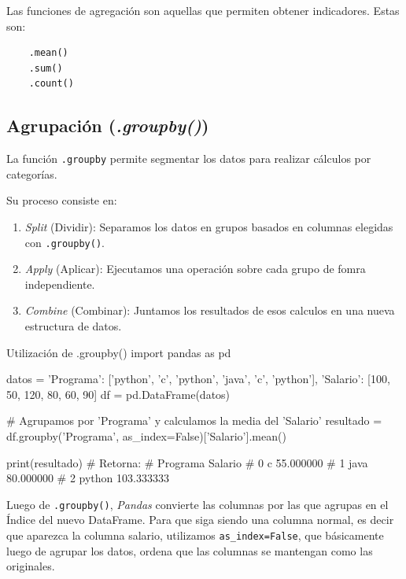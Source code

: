 Las funciones de agregación son aquellas que permiten obtener indicadores. Estas son:
\begin{verbatim}
    .mean() 
    .sum()
    .count()
\end{verbatim}



\subsection{Agrupación (\textit{.groupby()})}

La función \texttt{.groupby} permite segmentar los datos para realizar cálculos por categorías.

Su proceso consiste en:
\begin{enumerate}
    \item \textit{Split} (Dividir): Separamos los datos en grupos basados en columnas elegidas con \texttt{.groupby()}.
    \item \textit{Apply} (Aplicar): Ejecutamos una operación sobre cada grupo de fomra independiente.
    \item \textit{Combine} (Combinar): Juntamos los resultados de esos calculos en una nueva estructura de datos.
\end{enumerate}

\begin{pycode}{Utilización de .groupby()}
import pandas as pd

datos = {
    'Programa': ['python', 'c', 'python', 'java', 'c', 'python'],
    'Salario': [100, 50, 120, 80, 60, 90]
}
df = pd.DataFrame(datos)

# Agrupamos por 'Programa' y calculamos la media del 'Salario'
resultado = df.groupby('Programa', as_index=False)['Salario'].mean()

print(resultado) # Retorna:
#   Programa     Salario
# 0        c   55.000000
# 1     java   80.000000
# 2   python  103.333333
\end{pycode}

\begin{nota}
    Luego de \texttt{.groupby()}, \textit{Pandas} convierte las columnas por las que agrupas en el Índice del nuevo DataFrame. Para que siga siendo una columna normal, es decir que aparezca la columna salario, utilizamos \texttt{as\_index=False}, que básicamente luego de agrupar los datos, ordena que las columnas se mantengan como las originales.
\end{nota}

